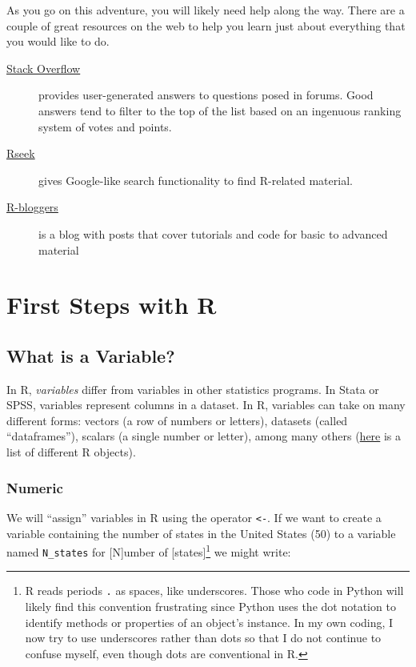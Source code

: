\documentclass[]{article}
\let\rmarkdownfootnote\footnote%
\def\footnote{\protect\rmarkdownfootnote}
\begin{document}
As you go on this adventure, you will likely need help along the way.
There are a couple of great resources on the web to help you learn just
about everything that you would like to do.

\begin{description}
\item[\href{https://stackoverflow.com/questions/tagged/r}{Stack
Overflow}]
provides user-generated answers to questions posed in forums. Good
answers tend to filter to the top of the list based on an ingenuous
ranking system of votes and points.
\item[\href{https://rseek.org/}{Rseek}]
gives Google-like search functionality to find R-related material.
\item[\href{https://www.r-bloggers.com/}{R-bloggers}]
is a blog with posts that cover tutorials and code for basic to advanced
material
\end{description}

\section{First Steps with R}\label{first-steps-with-r}

\subsection{What is a Variable?}\label{what-is-a-variable}

In R, \emph{variables} differ from variables in other statistics
programs. In Stata or SPSS, variables represent columns in a dataset. In
R, variables can take on many different forms: vectors (a row of numbers
or letters), datasets (called ``dataframes''), scalars (a single number
or letter), among many others
(\href{https://www.statmethods.net/input/datatypes.html}{here} is a list
of different R objects).

\hypertarget{vars_numeric}{\subsubsection{Numeric}\label{vars_numeric}}

We will ``assign'' variables in R using the operator
\texttt{\textless{}-}. If we want to create a variable containing the
number of states in the United States (50) to a variable named
\texttt{N\_states} for {[}N{]}umber of {[}states{]}\footnote{R reads
  periods \texttt{.} as spaces, like underscores. Those who code in
  Python will likely find this convention frustrating since Python uses
  the dot notation to identify methods or properties of an object's
  instance. In my own coding, I now try to use underscores rather than
  dots so that I do not continue to confuse myself, even though dots are
  conventional in R.} we might write:
\end{document}
